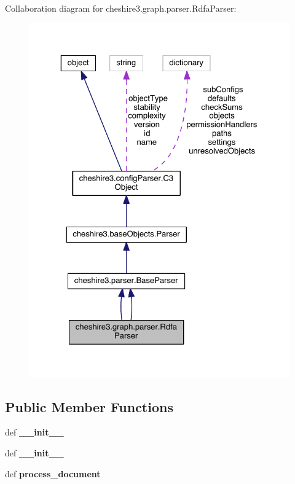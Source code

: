 Collaboration diagram for cheshire3.\-graph.\-parser.\-Rdfa\-Parser\-:
\nopagebreak
\begin{figure}[H]
\begin{center}
\leavevmode
\includegraphics[width=325pt]{classcheshire3_1_1graph_1_1parser_1_1_rdfa_parser__coll__graph}
\end{center}
\end{figure}
\subsection*{Public Member Functions}
\begin{DoxyCompactItemize}
\item 
\hypertarget{classcheshire3_1_1graph_1_1parser_1_1_rdfa_parser_ad09eb3eef68cc121a2907a67b3255ce7}{def {\bfseries \-\_\-\-\_\-init\-\_\-\-\_\-}}\label{classcheshire3_1_1graph_1_1parser_1_1_rdfa_parser_ad09eb3eef68cc121a2907a67b3255ce7}

\item 
\hypertarget{classcheshire3_1_1graph_1_1parser_1_1_rdfa_parser_ad09eb3eef68cc121a2907a67b3255ce7}{def {\bfseries \-\_\-\-\_\-init\-\_\-\-\_\-}}\label{classcheshire3_1_1graph_1_1parser_1_1_rdfa_parser_ad09eb3eef68cc121a2907a67b3255ce7}

\item 
\hypertarget{classcheshire3_1_1graph_1_1parser_1_1_rdfa_parser_a559f793da70f53a4333b6f6c7f53dcbd}{def {\bfseries process\-\_\-document}}\label{classcheshire3_1_1graph_1_1parser_1_1_rdfa_parser_a559f793da70f53a4333b6f6c7f53dcbd}

\end{DoxyCompactItemize}
